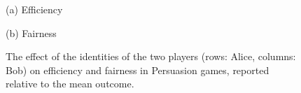 \begin{figure}[ht]
\vspace{1ex}
\begin{minipage}[t]{0.48\textwidth}
    \centering
    \hspace{12em} (a) Efficiency \par\vspace{1ex}
    
\end{minipage}
\hfill
\begin{minipage}[t]{0.48\textwidth}
    \centering
    (b) Fairness \par\vspace{1ex}
    
\end{minipage}
\centering
\caption{The effect of the identities of the two players (rows: Alice, columns: Bob) on efficiency and fairness in Persuasion games, reported relative to the mean outcome.}
\label{table:models_persuasion}
\end{figure}
